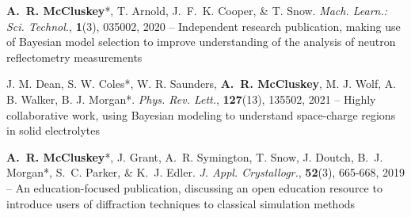 \begin{cventriesy}
  \cventryy
    {
      \begin{cvitemsy}
        \item {\textbf{A.~R. McCluskey}*, T. Arnold, J.~F.~K. Cooper, \& T. Snow. \emph{Mach. Learn.: Sci. Technol.}, \textbf{1}(3), 035002, 2020 -- Independent research publication, making use of Bayesian model selection to improve understanding of the analysis of neutron reflectometry measurements}
    \vspace{1mm}
        \item {J. M. Dean, S. W. Coles*, W. R. Saunders, \textbf{A.~R. McCluskey}, M. J. Wolf, A. B. Walker, B. J. Morgan*. \emph{Phys. Rev. Lett.}, \textbf{127}(13), 135502, 2021 -- Highly collaborative work, using Bayesian modeling to understand space-charge regions in solid electrolytes}
    \vspace{1mm}
        \item {\textbf{A.~R. McCluskey}*, J. Grant, A.~R. Symington, T. Snow, J. Doutch, B.~J. Morgan*, S.~C. Parker, \& K.~J. Edler. \emph{J. Appl. Crystallogr.}, \textbf{52}(3), 665-668, 2019 -- An education-focused publication, discussing an open education resource to introduce users of diffraction techniques to classical simulation methods} 
      \end{cvitemsy}
    }
\end{cventriesy}
